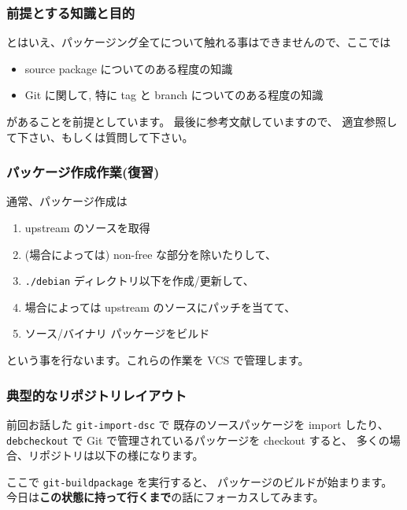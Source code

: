 \documentclass[mingoth,a4paper]{jsarticle}
\begin{document}
\subsubsection*{前提とする知識と目的}

とはいえ、パッケージング全てについて触れる事はできませんので、ここでは
\begin{itemize}
\item source package についてのある程度の知識
\item Git に関して, 特に tag と branch についてのある程度の知識
\end{itemize}
があることを前提としています。
最後に参考文献していますので、
適宜参照して下さい、もしくは質問して下さい。

\subsubsection*{パッケージ作成作業(復習)}

通常、パッケージ作成は

\begin{enumerate}
\item upstream のソースを取得
\item (場合によっては) non-free な部分を除いたりして、
\item \texttt{./debian} ディレクトリ以下を作成/更新して、
\item 場合によっては upstream のソースにパッチを当てて、
\item ソース/バイナリ パッケージをビルド
\end{enumerate}

という事を行ないます。これらの作業を VCS で管理します。

\subsubsection*{典型的なリポジトリレイアウト}

前回お話した \texttt{git-import-dsc} で
既存のソースパッケージを import したり、
\texttt{debcheckout} で Git で管理されているパッケージを
checkout すると、
多くの場合、リポジトリは以下の様になります。
ここで \texttt{git-buildpackage} を実行すると、
パッケージのビルドが始まります。
今日は\textbf{この状態に持って行くまで}の話にフォーカスしてみます。
\end{document}
